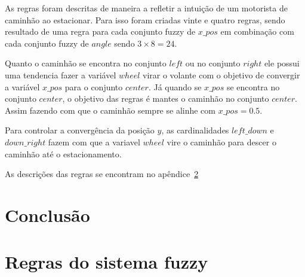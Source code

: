 \documentclass[12pt, a4paper]{article}
\begin{document}
As regras foram descritas de maneira a refletir a intuição de um motorista de caminhão ao estacionar.
Para isso foram criadas vinte e quatro regras, sendo resultado de uma regra para cada conjunto fuzzy de $x\_pos$ em combinação com cada conjunto fuzzy de $angle$ sendo $3 \times 8 = 24$.

Quanto o caminhão se encontra no conjunto $left$ ou no conjunto $right$ ele possui uma tendencia fazer a variável $wheel$ virar o volante com o objetivo de convergir a variável $x\_pos$ para o conjunto $center$.
Já quando se $x\_pos$ se encontra no conjunto $center$, o objetivo das regras é mantes o caminhão no conjunto $center$.
Assim fazendo com que o caminhão sempre se alinhe com $x\_pos = 0.5$.

Para controlar a convergência da posição $y$, as cardinalidades $left\_down$ e $down\_right$ fazem com que a variavel $wheel$ vire o caminhão para descer o caminhão até o estacionamento.

As descrições das regras se encontram no apêndice~\ref{sec:apendice}


\section{Conclusão}

\appendix
\section{Regras do sistema fuzzy}\label{sec:apendice}
\end{document}
